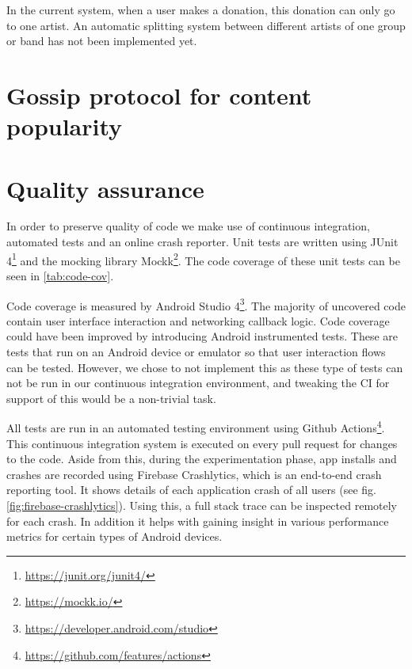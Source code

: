 In the current system, when a user makes a donation, this donation can only go to one artist. An automatic splitting system between different artists of one group or band has not been implemented yet.

\section{Gossip protocol for content popularity}

\section{Quality assurance}
In order to preserve quality of code we make use of continuous integration, automated tests and an online crash reporter. Unit tests are written using JUnit 4\footnote{\url{https://junit.org/junit4/}} and the mocking library Mockk\footnote{\url{https://mockk.io/}}. The code coverage of these unit tests can be seen in \ref{tab:code-cov}. 

Code coverage is measured by Android Studio 4\footnote{\url{https://developer.android.com/studio}}. The majority of uncovered code contain user interface interaction and networking callback logic. Code coverage could have been improved by introducing Android instrumented tests. These are tests that run on an Android device or emulator so that user interaction flows can be tested. However, we chose to not implement this as these type of tests can not be run in our continuous integration environment, and tweaking the CI for support of this would be a non-trivial task.

All tests are run in an automated testing environment using Github Actions\footnote{\url{https://github.com/features/actions}}. This continuous integration system is executed on every pull request for changes to the code. Aside from this, during the experimentation phase, app installs and crashes are recorded using Firebase Crashlytics, which is an end-to-end crash reporting tool. It shows details of each application crash of all users (see fig. \ref{fig:firebase-crashlytics}). Using this, a full stack trace can be inspected remotely for each crash. In addition it helps with gaining insight in various performance metrics for certain types of Android devices.

